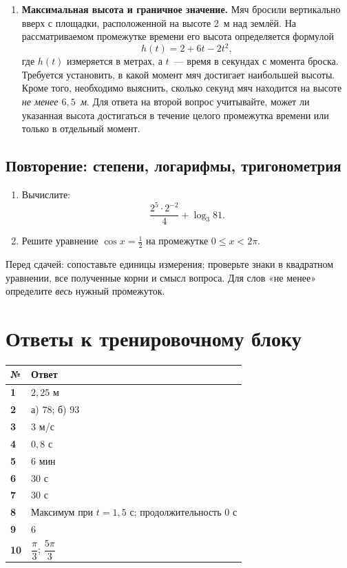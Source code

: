 \documentclass[a4paper,11pt]{article}
\newcommand{\keyword}[1]{\textcolor{darkaccent}{#1}}
\begin{document}
\begin{enumerate}[label=\textbf{\arabic*.},leftmargin=1.0cm,itemsep=9pt]
\item \textbf{Максимальная высота и граничное значение.} Мяч бросили вертикально вверх с площадки, расположенной на высоте $2$~м над землёй. На рассматриваемом промежутке времени его высота определяется формулой
\[
 h(t)=2+6t-2t^2,
\]
где $h(t)$ измеряется в метрах, а $t$~--- время в секундах с момента броска. Требуется установить, в какой момент мяч достигает наибольшей высоты. Кроме того, необходимо выяснить, сколько секунд мяч находится на высоте \emph{не менее $6{,}5$~м}. Для ответа на второй вопрос учитывайте, может ли указанная высота достигаться в течение целого промежутка времени или только в отдельный момент.
\end{enumerate}

\subsection*{Повторение: степени, логарифмы, тригонометрия}
\begin{enumerate}[label=\textbf{\arabic*.},leftmargin=1.0cm,itemsep=9pt,start=9]
\item Вычислите:
\[
\frac{2^5\cdot 2^{-2}}{4}+\log_3 81.
\]

\item Решите уравнение $\cos x=\frac12$ на промежутке $0\le x<2\pi$.
\end{enumerate}

\vspace{7mm}
\noindent\keyword{Перед сдачей:} сопоставьте единицы измерения; проверьте знаки в квадратном уравнении, все полученные корни и смысл вопроса. Для слов «не менее» определите \emph{весь} нужный промежуток.
\par\endgroup
\clearpage

\section*{Ответы к тренировочному блоку}
\vspace{7mm}
\renewcommand{\arraystretch}{1.35}
\begin{center}
\begin{tabularx}{\linewidth}{@{}>{\bfseries}p{13mm}X@{}}
\toprule
№ & Ответ \\
\midrule
1 & $2{,}25$ м \\
2 & а) $78$; б) $93$ \\
3 & $3$ м/с \\
4 & $0{,}8$ с \\
5 & $6$ мин \\
6 & $30$ с \\
7 & $30$ с \\
8 & Максимум при $t=1{,}5$ с; продолжительность $0$ с \\
9 & $6$ \\
10 & $\dfrac{\pi}{3}$; $\dfrac{5\pi}{3}$ \\
\bottomrule
\end{tabularx}
\end{center}
\end{document}
